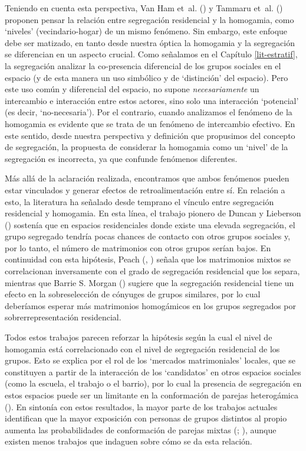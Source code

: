 \documentclass[
  spanish,
  a4paper,%
  chapterprefix=true,%
  DIV=calc,%
  twoside]{scrbook}%
\begin{document}
Teniendo en cuenta esta perspectiva, Van Ham et~al. () y Tammaru et~al. () proponen
pensar la relación entre segregación residencial y la homogamia, como
`niveles' (vecindario-hogar) de un mismo fenómeno. Sin embargo, este
enfoque debe ser matizado, en tanto desde nuestra óptica la homogamia y
la segregación se diferencian en un aspecto crucial. Como señalamos en
el Capítulo \ref{lit-estratif}, la segregación analizar la co-presencia
diferencial de los grupos sociales en el espacio (y de esta manera un
uso simbólico y de `distinción' del espacio). Pero este uso común y
diferencial del espacio, no supone \emph{necesariamente} un intercambio e
interacción entre estos actores, sino solo una interacción `potencial'
(es decir, `no-necesaria'). Por el contrario, cuando analizamos el
fenómeno de la homogamia es evidente que se trata de un fenómeno de
intercambio efectivo. En este sentido, desde nuestra perspectiva y
definición que propusimos del concepto de segregación, la propuesta de
considerar la homogamia como un `nivel' de la segregación es incorrecta,
ya que confunde fenómenos diferentes.

Más allá de la aclaración realizada, encontramos que ambos fenómenos
pueden estar vinculados y generar efectos de retroalimentación entre sí.
En relación a esto, la literatura ha señalado desde temprano el vínculo
entre segregación residencial y homogamia. En esta línea, el trabajo
pionero de Duncan y Lieberson () sostenía que en espacios residenciales donde
existe una elevada segregación, el grupo segregado tendría pocas chances
de contacto con otros grupos sociales y, por lo tanto, el número de
matrimonios con otros grupos serían bajos. En continuidad con esta
hipótesis, Peach (, ) señala que los matrimonios
mixtos se correlacionan inversamente con el grado de segregación
residencial que los separa, mientras que Barrie S. Morgan () sugiere que la
segregación residencial tiene un efecto en la sobreselección de cónyuges
de grupos similares, por lo cual deberíamos esperar más matrimonios
homogámicos en los grupos segregados por sobrerrepresentación
residencial.

Todos estos trabajos parecen reforzar la hipótesis según la cual el
nivel de homogamia está correlacionado con el nivel de segregación
residencial de los grupos. Esto se explica por el rol de los `mercados
matrimoniales' locales, que se constituyen a partir de la interacción de
los `candidatos' en otros espacios sociales (como la escuela, el trabajo
o el barrio), por lo cual la presencia de segregación en estos espacios
puede ser un limitante en la conformación de parejas heterogámica
(). En sintonía con estos resultados, la mayor parte de
los trabajos actuales identifican que la mayor exposición con personas
de grupos distintos al propio aumenta las probabilidades de conformación
de parejas mixtas (; ), aunque existen menos
trabajos que indaguen sobre cómo se da esta relación.
\end{document}
